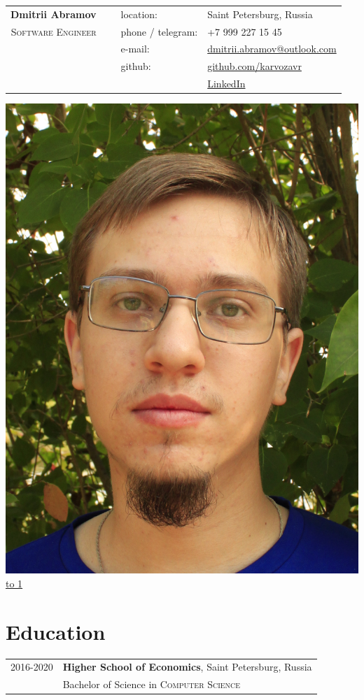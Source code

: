 \documentclass[10pt]{article}
\def\LINE{\vspace*{-1em}\noindent \underline{\hbox to 1\textwidth{{ } \hfil{ } \hfil{ } }}}
\begin{document}

\begin{tabular}{rlll}
       {\bf \huge Dmitrii Abramov} &  \  & location: &Saint Petersburg, Russia\\ 
    \textsc{\color{accent} Software Engineer} & \ & phone / telegram:   & +7 999 227 15 45\\
    & \ & e-mail:             & \href{mailto:dmitrii.abramov@outlook.com}{dmitrii.abramov@outlook.com}\\
    & \ & github:             & \href{https://github.com/karvozavr}{github.com/karvozavr}\\
   & \ &   \                 & \href{https://www.linkedin.com/in/dmitriy-abramov/}{LinkedIn}  
\end{tabular}
 \includegraphics[align=c, scale=0.05]{me.png} 
 \\
\LINE

\section*{\color{accent} Education}
\begin{tabular}{rl}
 \textsc{2016-2020} & \textbf{Higher School of Economics}, Saint Petersburg, Russia\\
 \  & Bachelor of Science in \textsc{Computer Science}
\end{tabular}
\end{document}

